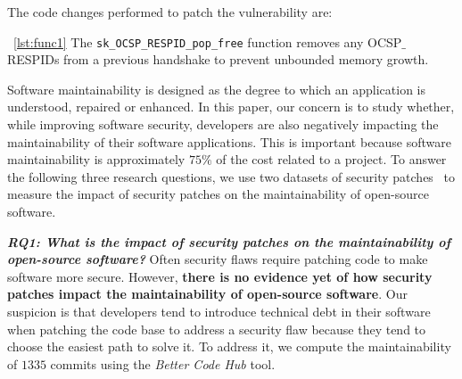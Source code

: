 \documentclass[10pt,conference]{IEEEtran}
\newcommand\Sof[1]{\nb{Sofia}{red}{#1}}
\begin{document}
The code changes performed to patch the vulnerability are:

~\ref{lst:func1} The \texttt{sk\_OCSP\_RESPID\_pop\_free} function removes any OCSP$\_$RESPIDs 
from a previous handshake to prevent unbounded memory growth.


Software maintainability is designed as the degree to which an application is understood, 
repaired or enhanced. In this paper, our concern is to study whether, while improving software
security, developers are also negatively impacting the maintainability of their
software applications. This is important because software maintainability is 
approximately $75\%$ of the cost related to a project. To answer the following three 
research questions, we use two datasets of security patches~\cite{Reis:2017:IJSSE, 10.1109/MSR.2019.00064} 
to measure the impact of security patches on the maintainability of open-source software. 
%

\textit{\textbf{RQ1: What is the impact of security patches on the
maintainability of open-source software?}} Often security flaws require patching 
code to make software more secure.
However, \textbf{there is no evidence yet of how security patches impact the
maintainability of open-source software}. Our suspicion is that developers tend
to introduce technical debt in their software when patching the code base to
address a security flaw because they tend to choose the easiest path to solve
it. To address it, we compute the maintainability of $1335$ commits using the
\emph{Better Code Hub} tool. 
%
\end{document}
